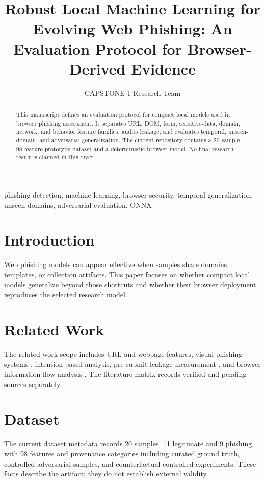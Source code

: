 \documentclass[journal]{IEEEtran}
\title{Robust Local Machine Learning for Evolving Web Phishing: An Evaluation Protocol for Browser-Derived Evidence}
\author{CAPSTONE-1 Research Team}
\begin{document}
\maketitle

\begin{abstract}
This manuscript defines an evaluation protocol for compact local models used in browser phishing assessment. It separates URL, DOM, form, sensitive-data, domain, network, and behavior feature families; audits leakage; and evaluates temporal, unseen-domain, and adversarial generalization. The current repository contains a 20-sample, 98-feature prototype dataset and a deterministic browser model. No final research result is claimed in this draft.
\end{abstract}

\begin{IEEEkeywords}
phishing detection, machine learning, browser security, temporal generalization, unseen domains, adversarial evaluation, ONNX
\end{IEEEkeywords}

\section{Introduction}
Web phishing models can appear effective when samples share domains, templates, or collection artifacts. This paper focuses on whether compact local models generalize beyond those shortcuts and whether their browser deployment reproduces the selected research model.

\section{Related Work}
The related-work scope includes URL and webpage features, visual phishing systems \cite{lin2021phishpedia}, intention-based analysis, pre-submit leakage measurement \cite{senol2022leakyforms}, and browser information-flow analysis \cite{siby2022webgraph}. The literature matrix records verified and pending sources separately.

\section{Dataset}
The current dataset metadata records 20 samples, 11 legitimate and 9 phishing, with 98 features and provenance categories including curated ground truth, controlled adversarial samples, and counterfactual controlled experiments. These facts describe the artifact; they do not establish external validity.
\end{document}
